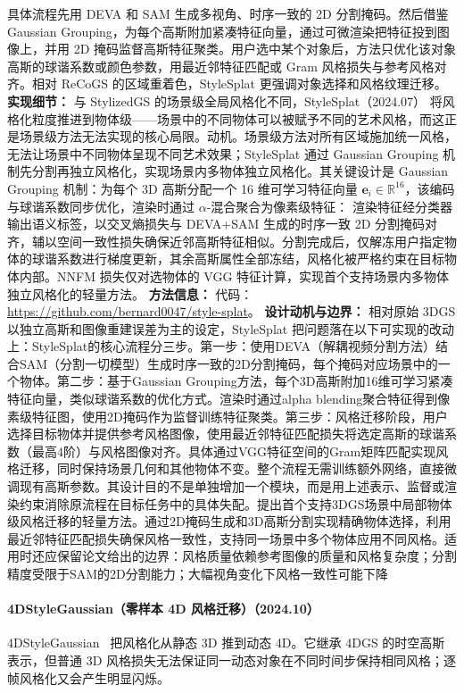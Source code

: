 具体流程先用 DEVA 和 SAM 生成多视角、时序一致的 2D 分割掩码。然后借鉴 Gaussian Grouping，为每个高斯附加紧凑特征向量，通过可微渲染把特征投到图像上，并用 2D 掩码监督高斯特征聚类。用户选中某个对象后，方法只优化该对象高斯的球谐系数或颜色参数，用最近邻特征匹配或 Gram 风格损失与参考风格对齐。相对 ReCoGS 的区域重着色，StyleSplat 更强调对象选择和风格纹理迁移。
\textbf{实现细节：} 与 StylizedGS 的场景级全局风格化不同，StyleSplat（2024.07） 将风格化粒度推进到物体级——场景中的不同物体可以被赋予不同的艺术风格，而这正是场景级方法无法实现的核心局限。动机。场景级方法对所有区域施加统一风格，无法让场景中不同物体呈现不同艺术效果；StyleSplat 通过 Gaussian Grouping 机制先分割再独立风格化，实现场景内多物体独立风格化。其关键设计是 Gaussian Grouping 机制：为每个 3D 高斯分配一个 16 维可学习特征向量 $\mathbf{e}_i \in \mathbb{R}^{16}$，该编码与球谐系数同步优化，渲染时通过 $\alpha$-混合聚合为像素级特征： 渲染特征经分类器输出语义标签，以交叉熵损失与 DEVA+SAM 生成的时序一致 2D 分割掩码对齐，辅以空间一致性损失确保近邻高斯特征相似。分割完成后，仅解冻用户指定物体的球谐系数进行梯度更新，其余高斯属性全部冻结，风格化被严格约束在目标物体内部。NNFM 损失仅对选物体的 VGG 特征计算，实现首个支持场景内多物体独立风格化的轻量方法。
\textbf{方法信息：} 代码：\url{https://github.com/bernard0047/style-splat}。
\textbf{设计动机与边界：} 相对原始 3DGS 以独立高斯和图像重建误差为主的设定，StyleSplat 把问题落在以下可实现的改动上：StyleSplat的核心流程分三步。第一步：使用DEVA（解耦视频分割方法）结合SAM（分割一切模型）生成时序一致的2D分割掩码，每个掩码对应场景中的一个物体。第二步：基于Gaussian Grouping方法，每个3D高斯附加16维可学习紧凑特征向量，类似球谐系数的优化方式。渲染时通过alpha blending聚合特征得到像素级特征图，使用2D掩码作为监督训练特征聚类。第三步：风格迁移阶段，用户选择目标物体并提供参考风格图像，使用最近邻特征匹配损失将选定高斯的球谐系数（最高4阶）与风格图像对齐。具体通过VGG特征空间的Gram矩阵匹配实现风格迁移，同时保持场景几何和其他物体不变。整个流程无需训练额外网络，直接微调现有高斯参数。其设计目的不是单独增加一个模块，而是用上述表示、监督或渲染约束消除原流程在目标任务中的具体失配。提出首个支持3DGS场景中局部物体级风格迁移的轻量方法。通过2D掩码生成和3D高斯分割实现精确物体选择，利用最近邻特征匹配损失确保风格一致性，支持同一场景中多个物体应用不同风格。适用时还应保留论文给出的边界：风格质量依赖参考图像的质量和风格复杂度；分割精度受限于SAM的2D分割能力；大幅视角变化下风格一致性可能下降
\paragraph{4DStyleGaussian（零样本 4D 风格迁移）（2024.10）}
4DStyleGaussian~\cite{2410_10412} 把风格化从静态 3D 推到动态 4D。它继承 4DGS 的时空高斯表示，但普通 3D 风格损失无法保证同一动态对象在不同时间步保持相同风格；逐帧风格化又会产生明显闪烁。

